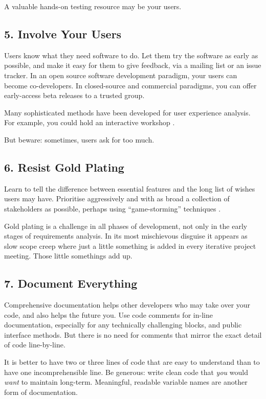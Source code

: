 \documentclass{bmcart}
\begin{document}
A valuable hands-on testing resource may be your users.  

\subsection*{5. Involve Your Users}

Users know what they need software to do. Let them try the software as early as possible, and make it easy for them to give feedback, via a mailing list or an issue tracker. In an open source software development paradigm, your users can become co-developers. In closed-source and commercial paradigms, you can offer early-access beta releases to a trusted group.  

Many sophisticated methods have been developed for user experience analysis. For example, you could hold an interactive workshop \cite{pavelin2014}. 

But beware: sometimes, users ask for too much. 

\subsection*{6. Resist Gold Plating}

Learn to tell the difference between essential features and the long list of wishes users may have. Prioritise aggressively and with as broad a collection of stakeholders as possible, perhaps using ``game-storming'' techniques \cite{gamestorm}.   

Gold plating is a challenge in all phases of development, not only in the early stages of requirements analysis. In its most mischievous disguise it appears as slow scope creep where just a little something is added in every iterative project meeting. Those little somethings add up. 

\subsection*{7. Document Everything}

Comprehensive documentation helps other developers who may take over your code, and also helps the future you. Use code comments for in-line documentation, especially for any technically challenging blocks, and public interface methods. But there is no need for comments that mirror the exact detail of code line-by-line. 

It is better to have two or three lines of code that are easy to understand than to have one incomprehensible line. Be generous: write clean code \cite{cleancode} that \textit{you} would \textit{want} to maintain long-term. Meaningful, readable variable names are another form of documentation. 
\end{document}

